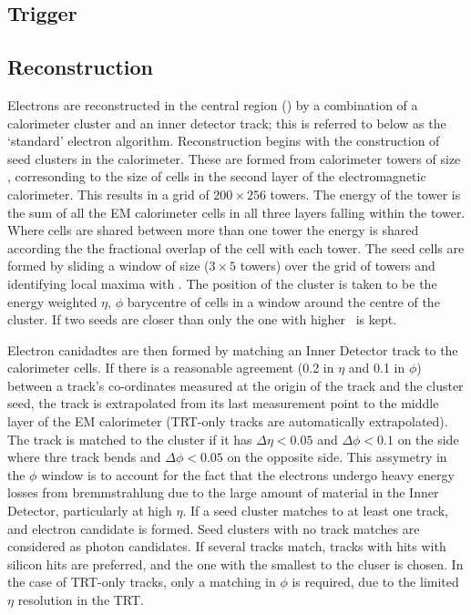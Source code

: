 \subsection{Trigger}
\label{sec:reco-el-triggers}

\subsection{Reconstruction}
Electrons are reconstructed in the central region () by a
combination of a calorimeter cluster and an inner detector track; this is
referred to below as the `standard' electron algorithm. Reconstruction begins
with the construction of seed clusters in the calorimeter. These are formed from
calorimeter towers of size , corresonding to the
size of cells in the second layer of the electromagnetic calorimeter. This
results in a grid of $200 \times 256$ towers. The energy
of the tower is the sum of all the EM calorimeter cells in all three layers
falling within the tower. Where cells are shared between more than one tower the
energy is shared according the the fractional overlap of the cell with each
tower. The seed cells are formed by sliding a
window of size  ($3 \times 5$ towers) over the
grid of towers and identifying local maxima with  \gev. The position
of the cluster is taken to be the energy weighted $\eta$, $\phi$ barycentre of
cells in a window around the centre of the cluster. If two seeds are closer than
 only the one with higher \et\ is kept.

Electron canidadtes are then formed by matching an Inner Detector track to the
calorimeter cells. If there is a reasonable agreement (0.2 in $\eta$ and 0.1 in
$\phi$) between a track's co-ordinates measured at the origin of the track and
the cluster seed, the track is extrapolated from its last measurement point to
the middle layer of the EM calorimeter (TRT-only tracks are automatically
extrapolated). The track is matched to the cluster if it has $\Delta \eta <
0.05$ and $\Delta \phi < 0.1$ on the side where thre track bends and  $\Delta
\phi < 0.05$ on the opposite side. This assymetry in the $\phi$ window is to
account for the fact that the electrons undergo heavy energy losses from
bremmstrahlung due to the large amount of material in the Inner Detector,
particularly at high $\eta$. If a seed cluster matches to at least one track,
and electron candidate is formed. Seed clusters with no track matches are
considered as photon candidates. If several tracks match, tracks with hits with
silicon hits are preferred, and the one with the smallest \deltaR to the cluser
is chosen. In the case of TRT-only tracks, only a matching in $\phi$ is required, 
due to the limited $\eta$ resolution in the TRT.

